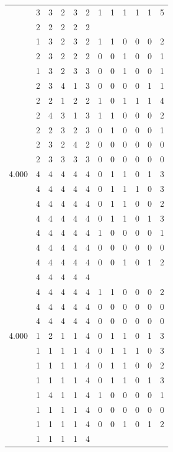\documentclass[]{msu-thesis}
\theoremstyle{definition}
\theoremstyle{definition}
\theoremstyle{definition}
\theoremstyle{remark}
\begin{document}
\begin{table}
{\begin{tabular}[t]{rrrrrrrrrrrr}
 & 3 & 3 & 2 & 3 & 2 & 1 & 1 & 1 & 1 & 1 & 5\\
 & 2 & 2 & 2 & 2 & 2 &  &  &  &  &  & \\
 & 1 & 3 & 2 & 3 & 2 & 1 & 1 & 0 & 0 & 0 & 2\\
 & 2 & 3 & 2 & 2 & 2 & 0 & 0 & 1 & 0 & 0 & 1\\
 & 1 & 3 & 2 & 3 & 3 & 0 & 0 & 1 & 0 & 0 & 1\\
 & 2 & 3 & 4 & 1 & 3 & 0 & 0 & 0 & 0 & 1 & 1\\
 & 2 & 2 & 1 & 2 & 2 & 1 & 0 & 1 & 1 & 1 & 4\\
 & 2 & 4 & 3 & 1 & 3 & 1 & 1 & 0 & 0 & 0 & 2\\
 & 2 & 2 & 3 & 2 & 3 & 0 & 1 & 0 & 0 & 0 & 1\\
 & 2 & 3 & 2 & 4 & 2 & 0 & 0 & 0 & 0 & 0 & 0\\
 & 2 & 3 & 3 & 3 & 3 & 0 & 0 & 0 & 0 & 0 & 0\\
4.000 & 4 & 4 & 4 & 4 & 4 & 0 & 1 & 1 & 0 & 1 & 3\\
 & 4 & 4 & 4 & 4 & 4 & 0 & 1 & 1 & 1 & 0 & 3\\
 & 4 & 4 & 4 & 4 & 4 & 0 & 1 & 1 & 0 & 0 & 2\\
 & 4 & 4 & 4 & 4 & 4 & 0 & 1 & 1 & 0 & 1 & 3\\
 & 4 & 4 & 4 & 4 & 4 & 1 & 0 & 0 & 0 & 0 & 1\\
 & 4 & 4 & 4 & 4 & 4 & 0 & 0 & 0 & 0 & 0 & 0\\
 & 4 & 4 & 4 & 4 & 4 & 0 & 0 & 1 & 0 & 1 & 2\\
 & 4 & 4 & 4 & 4 & 4 &  &  &  &  &  & \\
 & 4 & 4 & 4 & 4 & 4 & 1 & 1 & 0 & 0 & 0 & 2\\
 & 4 & 4 & 4 & 4 & 4 & 0 & 0 & 0 & 0 & 0 & 0\\
 & 4 & 4 & 4 & 4 & 4 & 0 & 0 & 0 & 0 & 0 & 0\\
4.000 & 1 & 2 & 1 & 1 & 4 & 0 & 1 & 1 & 0 & 1 & 3\\
 & 1 & 1 & 1 & 1 & 4 & 0 & 1 & 1 & 1 & 0 & 3\\
 & 1 & 1 & 1 & 1 & 4 & 0 & 1 & 1 & 0 & 0 & 2\\
 & 1 & 1 & 1 & 1 & 4 & 0 & 1 & 1 & 0 & 1 & 3\\
 & 1 & 4 & 1 & 1 & 4 & 1 & 0 & 0 & 0 & 0 & 1\\
 & 1 & 1 & 1 & 1 & 4 & 0 & 0 & 0 & 0 & 0 & 0\\
 & 1 & 1 & 1 & 1 & 4 & 0 & 0 & 1 & 0 & 1 & 2\\
 & 1 & 1 & 1 & 1 & 4 &  &  &  &  &  & \\

\end{tabular}}
\end{table}
\end{document}
